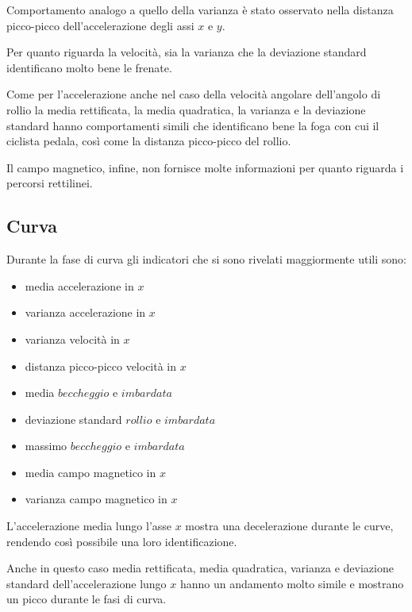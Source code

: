 \documentclass[12pt]{article}
\begin{document}
	Comportamento analogo a quello della varianza è stato osservato nella distanza picco-picco dell'accelerazione degli assi \(x\) e \(y\).\hfill\break
	
	Per quanto riguarda la velocità, sia la varianza che la deviazione standard identificano molto bene le frenate.\hfill\break
	
	Come per l'accelerazione anche nel caso della velocità angolare dell'angolo di rollio la media rettificata, la media quadratica, la varianza e la deviazione standard hanno comportamenti simili che identificano bene la foga con cui il ciclista pedala, così come la distanza picco-picco del rollio.\hfill\break
	
	Il campo magnetico, infine, non fornisce molte informazioni per quanto riguarda i percorsi rettilinei.
	
	\subsection{Curva}
	Durante la fase di curva gli indicatori che si sono rivelati maggiormente utili sono:
	\begin{itemize}
		\item media accelerazione in \(x\)
		\item varianza accelerazione in \(x\)
		\item varianza velocità in \(x\)
		\item distanza picco-picco velocità in \(x\)
		\item media \(beccheggio\) e \(imbardata\)
		\item deviazione standard \(rollio\) e \(imbardata\)
		\item massimo \(beccheggio\) e \(imbardata\)
		\item media campo magnetico in \(x\)
		\item varianza campo magnetico in \(x\)

	\end{itemize}
	
	
	L'accelerazione media lungo l'asse \(x\) mostra una decelerazione durante le curve, rendendo così possibile una loro identificazione.
	
	Anche in questo caso media rettificata, media quadratica, varianza e deviazione standard dell'accelerazione lungo \(x\) hanno un andamento molto simile e mostrano un picco durante le fasi di curva.\hfill\break
	
\end{document}
